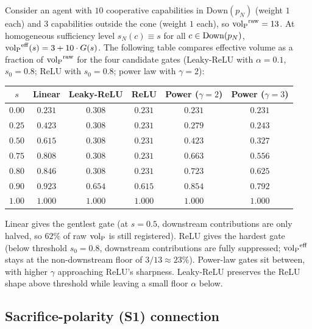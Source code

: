 \begin{remark}
\label{rem:gate_comparison}
Consider an agent with $10$ cooperative capabilities in
$\mathrm{Down}(p_N)$ (weight $1$ each) and $3$ capabilities
outside the cone (weight $1$ each), so
${\operatorname{vol}_{\mathrm{P}}}^{\mathrm{raw}} = 13$.  At homogeneous sufficiency level
$s_N(c) \equiv s$ for all $c \in \mathrm{Down}(p_N)$,
${\operatorname{vol}_{\mathrm{P}}}^{\mathrm{eff}}(s) = 3 + 10 \cdot G(s)$.  The following
table compares effective volume as a fraction of
${\operatorname{vol}_{\mathrm{P}}}^{\mathrm{raw}}$ for the four candidate gates (Leaky-ReLU
with $\alpha = 0.1$, $s_0 = 0.8$; ReLU with $s_0 = 0.8$; power
law with $\gamma = 2$):

\begin{center}
\small
\begin{tabular}{@{}cccccc@{}}
\toprule
$s$ & Linear & Leaky-ReLU & ReLU & Power ($\gamma{=}2$)
   & Power ($\gamma{=}3$) \\
\midrule
$0.00$ & $0.231$ & $0.308$ & $0.231$ & $0.231$ & $0.231$ \\
$0.25$ & $0.423$ & $0.308$ & $0.231$ & $0.279$ & $0.243$ \\
$0.50$ & $0.615$ & $0.308$ & $0.231$ & $0.423$ & $0.327$ \\
$0.75$ & $0.808$ & $0.308$ & $0.231$ & $0.663$ & $0.556$ \\
$0.80$ & $0.846$ & $0.308$ & $0.231$ & $0.723$ & $0.625$ \\
$0.90$ & $0.923$ & $0.654$ & $0.615$ & $0.854$ & $0.792$ \\
$1.00$ & $1.000$ & $1.000$ & $1.000$ & $1.000$ & $1.000$ \\
\bottomrule
\end{tabular}
\end{center}

Linear gives the gentlest gate (at $s = 0.5$, downstream
contributions are only halved, so $62\%$ of raw ${\operatorname{vol}_{\mathrm{P}}}$ is still
registered).  ReLU gives the hardest gate (below threshold
$s_0 = 0.8$, downstream contributions are fully suppressed;
${\operatorname{vol}_{\mathrm{P}}}^{\mathrm{eff}}$ stays at the non-downstream floor of
$3/13 \approx 23\%$).  Power-law gates sit between, with
higher $\gamma$ approaching ReLU's sharpness.  Leaky-ReLU
preserves the ReLU shape above threshold while leaving a small
floor $\alpha$ below.
\end{remark}

\subsection{Sacrifice-polarity (S1) connection}

